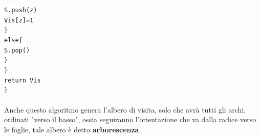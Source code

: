 \documentclass[12pt, letterpaper]{article}
\newcommand{\codee}[1]{\colorbox{white}{\texttt{#1}}}
\newcommand{\acc}{\\\hphantom{}\\}
\begin{document}
\hphantom{ident}\hphantom{ident}\hphantom{ident}\codee{S.push(z)}\\
\hphantom{ident}\hphantom{ident}\hphantom{ident}\codee{Vis[z]=1}\\
\hphantom{ident}\hphantom{ident}\codee{\}}\\
\hphantom{ident}\hphantom{ident}\codee{else\{}\\
\hphantom{ident}\hphantom{ident}\hphantom{ident}\codee{S.pop()}\\
\hphantom{ident}\hphantom{ident}\codee{\}}\\
\hphantom{ident}\codee{\}}\\
\hphantom{ident}\codee{return Vis}\\
\codee{\}}\acc 
Anche questo algoritmo genera l'albero di visita, solo che avrà tutti gli archi, ordinati "verso il basso", ossia 
seguiranno l'orientazione che va dalla radice verso le foglie, tale albero è detto \textbf{arborescenza}.
\end{document}

